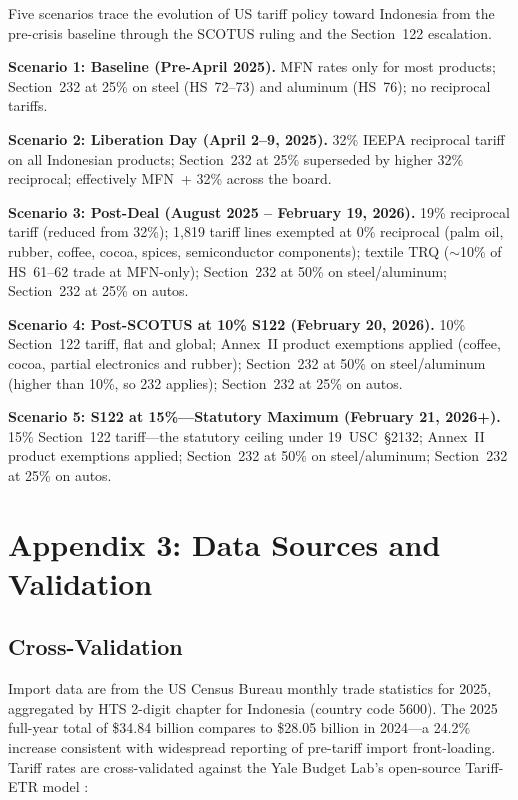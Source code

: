 \documentclass[12pt,a4paper]{article}
\begin{document}
Five scenarios trace the evolution of US tariff policy toward Indonesia from the pre-crisis baseline through the SCOTUS ruling and the Section~122 escalation.

\textbf{Scenario 1: Baseline (Pre-April 2025).}
MFN rates only for most products; Section~232 at 25\% on steel (HS~72--73) and aluminum (HS~76); no reciprocal tariffs.

\textbf{Scenario 2: Liberation Day (April 2--9, 2025).}
32\% IEEPA reciprocal tariff on all Indonesian products; Section~232 at 25\% superseded by higher 32\% reciprocal; effectively MFN~+ 32\% across the board.

\textbf{Scenario 3: Post-Deal (August 2025 -- February 19, 2026).}
19\% reciprocal tariff (reduced from 32\%); 1,819 tariff lines exempted at 0\% reciprocal (palm oil, rubber, coffee, cocoa, spices, semiconductor components); textile TRQ ($\sim$10\% of HS~61--62 trade at MFN-only); Section~232 at 50\% on steel/aluminum; Section~232 at 25\% on autos.

\textbf{Scenario 4: Post-SCOTUS at 10\% S122 (February 20, 2026).}
10\% Section~122 tariff, flat and global; Annex~II product exemptions applied (coffee, cocoa, partial electronics and rubber); Section~232 at 50\% on steel/aluminum (higher than 10\%, so 232 applies); Section~232 at 25\% on autos.

\textbf{Scenario 5: S122 at 15\%---Statutory Maximum (February 21, 2026+).}
15\% Section~122 tariff---the statutory ceiling under 19~USC~\S2132; Annex~II product exemptions applied; Section~232 at 50\% on steel/aluminum; Section~232 at 25\% on autos.

\section*{Appendix 3: Data Sources and Validation}

\subsection*{Cross-Validation}

Import data are from the US Census Bureau monthly trade statistics for 2025, aggregated by HTS 2-digit chapter for Indonesia (country code 5600). The 2025 full-year total of \$34.84 billion compares to \$28.05 billion in 2024---a 24.2\% increase consistent with widespread reporting of pre-tariff import front-loading. Tariff rates are cross-validated against the Yale Budget Lab's open-source Tariff-ETR model \cite{yalebudgetlab_model}:
\end{document}

